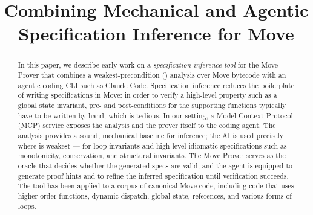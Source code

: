 \documentclass[letterpaper,conference]{IEEEtran}
\begin{document}
\title{Combining Mechanical and Agentic \\ Specification Inference for Move}

\author{%
}

\maketitle


\begin{abstract}
	In this paper, we describe early work on a \emph{specification inference tool} for the Move Prover that combines a weakest-precondition (\WP) analysis over Move bytecode with an agentic coding CLI such as Claude Code.
	Specification inference reduces the boilerplate of writing specifications in Move: in order to verify a high-level property such as a global state invariant, pre- and post-conditions for the supporting functions typically have to be written by hand, which is tedious.
	In our setting, a Model Context Protocol (MCP) service exposes the \WP analysis and the prover itself to the coding agent.
	The \WP analysis provides a sound, mechanical baseline for inference; the AI is used precisely where \WP is weakest --- for loop invariants and high-level idiomatic specifications such as monotonicity, conservation, and structural invariants.
	The Move Prover serves as the oracle that decides whether the generated specs are valid, and the agent is equipped to generate proof hints and to refine the inferred specification until verification succeeds.
	The tool has been applied to a corpus of canonical Move code, including code that uses higher-order functions, dynamic dispatch, global state, references, and various forms of loops.
\end{abstract}









\end{document}
